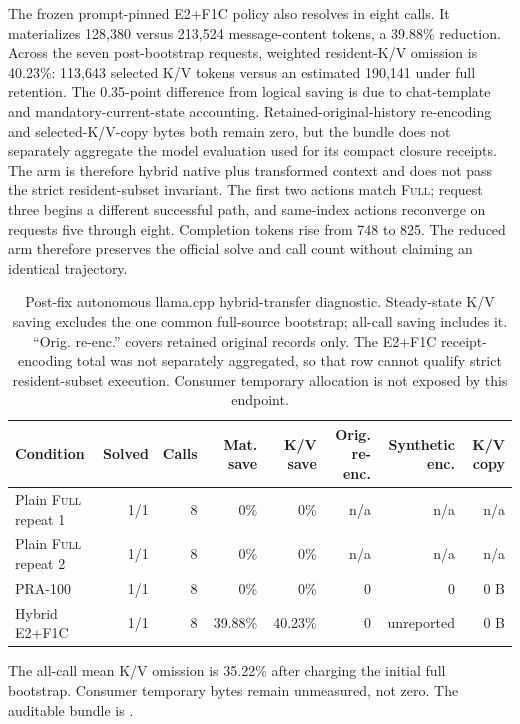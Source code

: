 \documentclass[11pt]{article}
\begin{document}
The frozen prompt-pinned E2+F1C policy also resolves in eight calls.  It
materializes 128,380 versus 213,524 message-content tokens, a 39.88\%
reduction.  Across the seven post-bootstrap requests, weighted resident-K/V
omission is 40.23\%: 113,643 selected K/V tokens versus an estimated 190,141
under full retention.  The 0.35-point difference from logical saving is due to
chat-template and mandatory-current-state accounting.  Retained-original-history
re-encoding and selected-K/V-copy bytes both remain zero, but the bundle does
not separately aggregate the model evaluation used for its compact closure
receipts.  The arm is therefore hybrid native plus transformed context and does
not pass the strict resident-subset invariant.  The first
two actions match \textsc{Full}; request three begins a different successful
path, and same-index actions reconverge on requests five through eight.
Completion tokens rise from 748 to 825.  The reduced arm therefore preserves
the official solve and call count without claiming an identical trajectory.

\begin{table}[H]
\centering
\small
\caption{Post-fix autonomous llama.cpp hybrid-transfer diagnostic.  Steady-state
K/V saving excludes the one common full-source bootstrap; all-call saving
includes it.  ``Orig. re-enc.'' covers retained original records only.  The
E2+F1C receipt-encoding total was not separately aggregated, so that row cannot
qualify strict resident-subset execution. Consumer temporary allocation is not
exposed by this endpoint.}
\begin{tabular}{lrrrrrrr}
\toprule
Condition & Solved & Calls & Mat. save & K/V save & Orig. re-enc. & Synthetic enc. & K/V copy \\
\midrule
Plain \textsc{Full} repeat 1 & 1/1 & 8 & 0\% & 0\% & n/a & n/a & n/a \\
Plain \textsc{Full} repeat 2 & 1/1 & 8 & 0\% & 0\% & n/a & n/a & n/a \\
PRA-100 & 1/1 & 8 & 0\% & 0\% & 0 & 0 & 0 B \\
Hybrid E2+F1C & 1/1 & 8 & 39.88\% & 40.23\% & 0 & unreported & 0 B \\
\bottomrule
\end{tabular}
\label{tab:agent-e2e-llamacpp-postfix}
\end{table}

The all-call mean K/V omission is 35.22\% after charging the initial full
bootstrap.  Consumer temporary bytes remain unmeasured, not zero.  The
auditable bundle is
.
\end{document}
